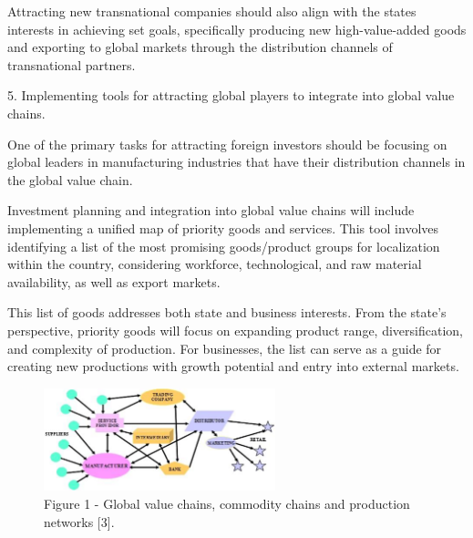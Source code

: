 \begin{multicols}{2}
Attracting new transnational companies should also align with the
state\textquotesingle s interests in achieving set goals, specifically
producing new high-value-added goods and exporting to global markets
through the distribution channels of transnational partners.

5. Implementing tools for attracting global players to integrate into
global value chains.

One of the primary tasks for attracting foreign investors should be
focusing on global leaders in manufacturing industries that have their
distribution channels in the global value chain.

Investment planning and integration into global value chains will
include implementing a unified map of priority goods and services. This
tool involves identifying a list of the most promising goods/product
groups for localization within the country, considering workforce,
technological, and raw material availability, as well as export markets.

This list of goods addresses both state and business interests. From the
state's perspective, priority goods will focus on expanding product
range, diversification, and complexity of production. For businesses,
the list can serve as a guide for creating new productions with growth
potential and entry into external markets.
\end{multicols}

\begin{figure}[H]
	\centering
	\includegraphics[width=0.6\textwidth]{assets/340}
	\caption*{Figure 1 - Global value chains, commodity chains and production networks {[}3{]}.}
\end{figure}

